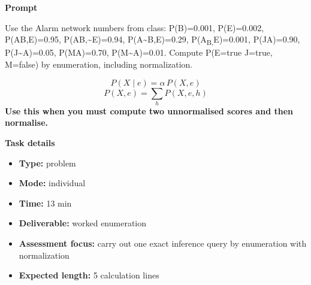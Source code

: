 \documentclass[11pt]{article}
\begin{document}
\begin{tcolorbox}[colback=white,colframe=MidnightBlue,title={Q2 Structured Problem},fonttitle=\bfseries,breakable]
\begin{center}
\end{center}

{\large\bfseries\color{MidnightBlue} Prompt}\par\medskip
Use the Alarm network numbers from class: P(B)=0.001, P(E)=0.002, P(A\textbar B,E)=0.95, P(A\textbar B,\textasciitilde E)=0.94, P(A\textbar\textasciitilde B,E)=0.29, P(A\textbar{}\textsubscript{B,}E)=0.001, P(J\textbar A)=0.90, P(J\textbar\textasciitilde A)=0.05, P(M\textbar A)=0.70, P(M\textbar\textasciitilde A)=0.01. Compute P(E=true \textbar{} J=true, M=false) by enumeration, including normalization.

\begin{tcolorbox}[colback=ForestGreen!5,colframe=ForestGreen,title={Formula reminder},fonttitle=\bfseries,breakable]
\[
P(X \mid e)=\alpha \, P(X,e)
\]
\[
P(X,e)=\sum_{h} P(X,e,h)
\]
\textbf{Use this when you must compute two unnormalised scores and then normalise.}
\end{tcolorbox}

{\large\bfseries\color{MidnightBlue} Task details}\par\medskip
\begin{itemize}\item \textbf{Type:} problem
\item \textbf{Mode:} individual
\item \textbf{Time:} 13 min
\item \textbf{Deliverable:} worked enumeration
\item \textbf{Assessment focus:} carry out one exact inference query by enumeration with normalization
\item \textbf{Expected length:} 5 calculation lines\end{itemize}


\end{tcolorbox}
\end{document}
